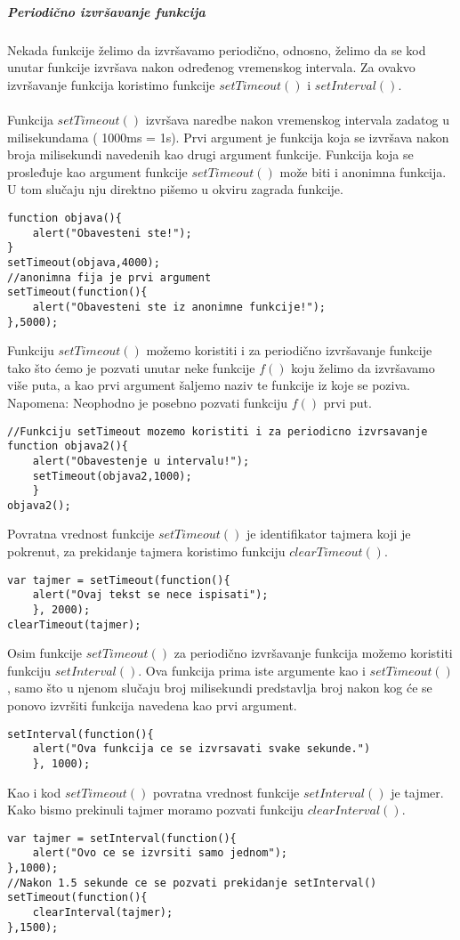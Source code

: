 \subparagraph{Periodično izvršavanje funkcija}
Nekada funkcije želimo da izvršavamo periodično, odnosno, želimo da se kod unutar funkcije izvršava nakon određenog vremenskog intervala. Za ovakvo izvršavanje funkcija koristimo funkcije $setTimeout()$ i $setInterval()$.\\\\
Funkcija $setTimeout()$ izvršava naredbe nakon vremenskog intervala zadatog u milisekundama ( 1000ms = 1s). Prvi argument je funkcija koja se izvršava nakon broja milisekundi navedenih kao drugi argument funkcije. Funkcija koja se prosleđuje kao argument funkcije $setTimeout()$ može biti i anonimna funkcija. U tom slučaju nju direktno pišemo u okviru zagrada funkcije. 
\begin{lstlisting}[backgroundcolor = \color{lightgray}, breaklines=true]
function objava(){
	alert("Obavesteni ste!");
}
setTimeout(objava,4000);
//anonimna fija je prvi argument
setTimeout(function(){
	alert("Obavesteni ste iz anonimne funkcije!");
},5000);
\end{lstlisting}
Funkciju $setTimeout()$ možemo koristiti i za periodično izvršavanje funkcije tako što ćemo je pozvati unutar neke funkcije $f()$ koju želimo da izvršavamo više puta, a kao prvi argument šaljemo naziv te funkcije iz koje se poziva. Napomena: Neophodno je posebno pozvati funkciju $f()$ prvi put.
\begin{lstlisting}[backgroundcolor = \color{lightgray}, breaklines=true]
 //Funkciju setTimeout mozemo koristiti i za periodicno izvrsavanje
function objava2(){
	alert("Obavestenje u intervalu!");
    setTimeout(objava2,1000);
	}
objava2();
\end{lstlisting}
Povratna vrednost funkcije $setTimeout()$ je identifikator tajmera koji je pokrenut, za prekidanje tajmera koristimo funkciju $clearTimeout()$.
\begin{lstlisting}[backgroundcolor = \color{lightgray}, breaklines=true]
var tajmer = setTimeout(function(){
	alert("Ovaj tekst se nece ispisati");
	}, 2000);
clearTimeout(tajmer);
\end{lstlisting}
Osim funkcije $setTimeout()$ za periodično izvršavanje funkcija možemo koristiti funkciju $setInterval()$. Ova funkcija prima iste argumente kao i $setTimeout()$, samo što u njenom slučaju broj milisekundi predstavlja broj nakon kog će se ponovo izvršiti funkcija navedena kao prvi argument.
\begin{lstlisting}[backgroundcolor = \color{lightgray}, breaklines=true]
setInterval(function(){
	alert("Ova funkcija ce se izvrsavati svake sekunde.")
	}, 1000);
\end{lstlisting}
Kao i kod $setTimeout()$ povratna vrednost funkcije $setInterval()$ je tajmer. Kako bismo prekinuli tajmer moramo pozvati funkciju $clearInterval()$.
\begin{lstlisting}[backgroundcolor = \color{lightgray}, breaklines=true]
var tajmer = setInterval(function(){
	alert("Ovo ce se izvrsiti samo jednom");
},1000);
//Nakon 1.5 sekunde ce se pozvati prekidanje setInterval()
setTimeout(function(){
	clearInterval(tajmer);
},1500);
\end{lstlisting}

